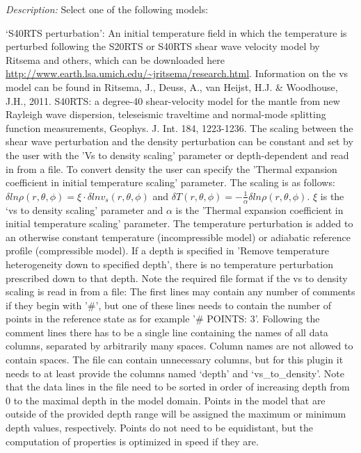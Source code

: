 \begin{itemize}
{\it Description:} Select one of the following models:

`S40RTS perturbation': An initial temperature field in which the temperature is perturbed following the S20RTS or S40RTS shear wave velocity model by Ritsema and others, which can be downloaded here \url{http://www.earth.lsa.umich.edu/~jritsema/research.html}. Information on the vs model can be found in Ritsema, J., Deuss, A., van Heijst, H.J. \& Woodhouse, J.H., 2011. S40RTS: a degree-40 shear-velocity model for the mantle from new Rayleigh wave dispersion, teleseismic traveltime and normal-mode splitting function measurements, Geophys. J. Int. 184, 1223-1236. The scaling between the shear wave perturbation and the density perturbation can be constant and set by the user with the 'Vs to density scaling' parameter or depth-dependent and read in from a file. To convert density the user can specify the 'Thermal expansion coefficient in initial temperature scaling' parameter. The scaling is as follows: $\delta ln \rho (r,\theta,\phi) = \xi \cdot \delta ln v_s(r,\theta, \phi)$ and $\delta T(r,\theta,\phi) = - \frac{1}{\alpha} \delta ln \rho(r,\theta,\phi)$. $\xi$ is the `vs to density scaling' parameter and $\alpha$ is the 'Thermal expansion coefficient in initial temperature scaling' parameter. The temperature perturbation is added to an otherwise constant temperature (incompressible model) or adiabatic reference profile (compressible model). If a depth is specified in 'Remove temperature heterogeneity down to specified depth', there is no temperature perturbation prescribed down to that depth.
Note the required file format if the vs to density scaling is read in from a file: The first lines may contain any number of comments if they begin with '#', but one of these lines needs to contain the number of points in the reference state as for example '# POINTS: 3'. Following the comment lines there has to be a single line containing the names of all data columns, separated by arbitrarily many spaces. Column names are not allowed to contain spaces. The file can contain unnecessary columns, but for this plugin it needs to at least provide the columns named `depth' and `vs\_to\_density'. Note that the data lines in the file need to be sorted in order of increasing depth from 0 to the maximal depth in the model domain. Points in the model that are outside of the provided depth range will be assigned the maximum or minimum depth values, respectively. Points do not need to be equidistant, but the computation of properties is optimized in speed if they are.


\end{itemize}
